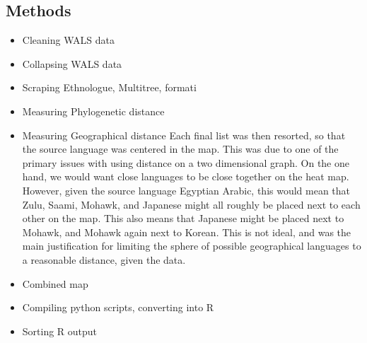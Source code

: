 \documentclass[11pt]{article}
\begin{document}
\subsection{Methods}
\begin{itemize}
\item Cleaning WALS data
\item Collapsing WALS data
\item Scraping Ethnologue, Multitree, formati
\item Measuring Phylogenetic distance
\item Measuring Geographical distance
Each final list was then resorted, so that the source language was centered in the map. This was due to one of the primary issues with using distance on a two dimensional graph. On the one hand, we would want close languages to be close together on the heat map. However, given the source language Egyptian Arabic, this would mean that Zulu, Saami, Mohawk, and Japanese might all roughly be placed next to each other on the map. This also means that Japanese might be placed next to Mohawk, and Mohawk again next to Korean. This is not ideal, and was the main justification for limiting the sphere of possible geographical languages to a reasonable distance, given the data. 
\item Combined map

%

\item Compiling python scripts, converting into R
\item Sorting R output
\end{itemize}
\end{document}
